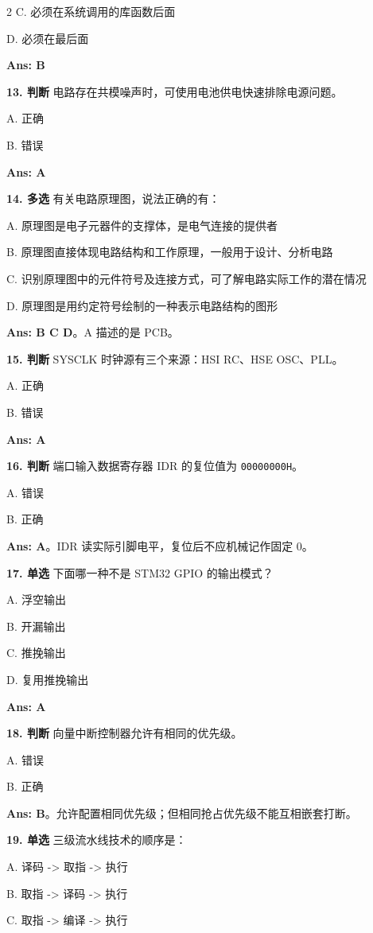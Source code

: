 \documentclass[UTF8,zihao=-5]{ctexart}
\begin{document}
\begin{multicols*}{2}
C. 必须在系统调用的库函数后面\par
D. 必须在最后面\par
\textbf{Ans: B}\par
\textbf{13. 判断} 电路存在共模噪声时，可使用电池供电快速排除电源问题。\par
A. 正确\par
B. 错误\par
\textbf{Ans: A}\par
\textbf{14. 多选} 有关电路原理图，说法正确的有：\par
A. 原理图是电子元器件的支撑体，是电气连接的提供者\par
B. 原理图直接体现电路结构和工作原理，一般用于设计、分析电路\par
C. 识别原理图中的元件符号及连接方式，可了解电路实际工作的潜在情况\par
D. 原理图是用约定符号绘制的一种表示电路结构的图形\par
\textbf{Ans: B C D}。A 描述的是 PCB。\par
\textbf{15. 判断} SYSCLK 时钟源有三个来源：HSI RC、HSE OSC、PLL。\par
A. 正确\par
B. 错误\par
\textbf{Ans: A}\par
\textbf{16. 判断} 端口输入数据寄存器 IDR 的复位值为 \texttt{00000000H}。\par
A. 错误\par
B. 正确\par
\textbf{Ans: A}。IDR 读实际引脚电平，复位后不应机械记作固定 0。\par
\textbf{17. 单选} 下面哪一种不是 STM32 GPIO 的输出模式？\par
A. 浮空输出\par
B. 开漏输出\par
C. 推挽输出\par
D. 复用推挽输出\par
\textbf{Ans: A}\par
\textbf{18. 判断} 向量中断控制器允许有相同的优先级。\par
A. 错误\par
B. 正确\par
\textbf{Ans: B}。允许配置相同优先级；但相同抢占优先级不能互相嵌套打断。\par
\textbf{19. 单选} 三级流水线技术的顺序是：\par
A. 译码 -> 取指 -> 执行\par
B. 取指 -> 译码 -> 执行\par
C. 取指 -> 编译 -> 执行\par

\end{multicols*}
\end{document}
